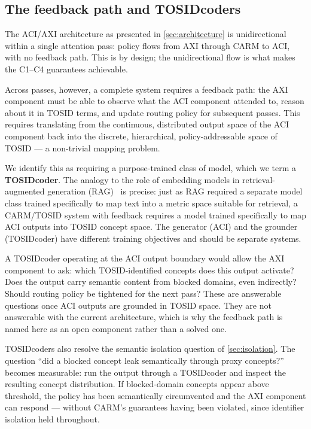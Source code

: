 \documentclass[11pt,a4paper]{article}
\theoremstyle{definition}
\begin{document}
\subsection{The feedback path and TOSIDcoders}
\label{sec:tosidcoders}

The ACI/AXI architecture as presented in \cref{sec:architecture} is
unidirectional within a single attention pass: policy flows from AXI through
CARM to ACI, with no feedback path. This is by design; the unidirectional
flow is what makes the C1--C4 guarantees achievable.

Across passes, however, a complete system requires a feedback path: the AXI
component must be able to observe what the ACI component attended to, reason
about it in TOSID terms, and update routing policy for subsequent passes.
This requires translating from the continuous, distributed output space of the
ACI component back into the discrete, hierarchical, policy-addressable space
of TOSID --- a non-trivial mapping problem.

We identify this as requiring a purpose-trained class of model, which we term
a \textbf{TOSIDcoder}. The analogy to the role of embedding models in
retrieval-augmented generation (RAG)~\cite{Lewis2020} is precise: just as RAG
required a separate model class trained specifically to map text into a metric
space suitable for retrieval, a CARM/TOSID system with feedback requires a
model trained specifically to map ACI outputs into TOSID concept space. The
generator (ACI) and the grounder (TOSIDcoder) have different training
objectives and should be separate systems.

A TOSIDcoder operating at the ACI output boundary would allow the AXI
component to ask: which TOSID-identified concepts does this output activate?
Does the output carry semantic content from blocked domains, even indirectly?
Should routing policy be tightened for the next pass? These are answerable
questions once ACI outputs are grounded in TOSID space. They are not answerable
with the current architecture, which is why the feedback path is named here
as an open component rather than a solved one.

TOSIDcoders also resolve the semantic isolation question of
\cref{sec:isolation}. The question ``did a blocked concept leak semantically
through proxy concepts?'' becomes measurable: run the output through a
TOSIDcoder and inspect the resulting concept distribution. If blocked-domain
concepts appear above threshold, the policy has been semantically circumvented
and the AXI component can respond --- without CARM's guarantees having been
violated, since identifier isolation held throughout.
\end{document}
